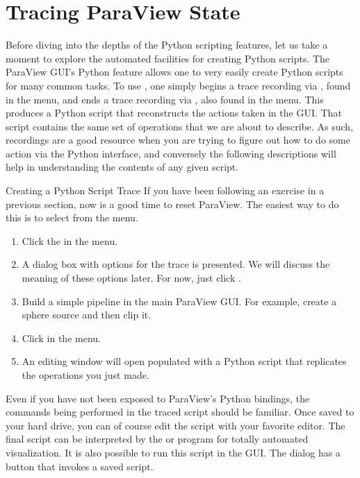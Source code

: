 \section{Tracing ParaView State}
\label{sec:TracingParaViewState}


Before diving into the depths of the Python scripting features, let us take
a moment to explore the automated facilities for creating Python scripts.
The ParaView GUI's Python  feature allows one to
very easily create Python scripts for many common tasks. To use
, one simply begins a trace recording via ,
found in the  menu, and ends a trace recording via ,
also found in the  menu. This produces a Python script that
reconstructs the actions taken in the GUI. That script contains the same
set of operations that we are about to describe. As such, 
recordings are a good resource when you are trying to figure out how to do
some action via the Python interface, and conversely the following
descriptions will help in understanding the contents of any given
 script.

\begin{exercise}{Creating a Python Script Trace}
  \label{ex:CreatingAPythonScriptTrace}%
  If you have been following an exercise in a previous section, now is a
  good time to reset ParaView.  The easiest way to do this is to select
   \ra {} from the menu.

  \begin{enumerate}
  \item Click the  in the  menu.
  \item A dialog box with options for the trace is presented. We will
    discuss the meaning of these options later. For now, just click
    .
  \item Build a simple pipeline in the main
    ParaView GUI.  For example, create a sphere source and then clip it.
  \item Click  in the  menu.
  \item An editing window will open populated with a Python script that
    replicates the operations you just made.
  \end{enumerate}

  Even if you have not been exposed to ParaView's Python bindings, the
  commands being performed in the traced script should be familiar.  Once
  saved to your hard drive, you can of course edit the script with your
  favorite editor.  The final script can be interpreted by the
   or  program for totally
  automated visualization.  It is also possible to run this script in the
  GUI.  The  dialog has a  button that
  invokes a saved script.
\end{exercise}

